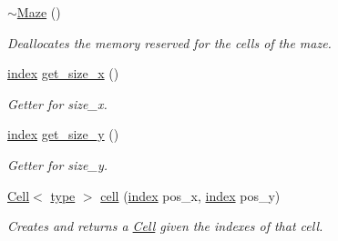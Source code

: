 \begin{DoxyCompactItemize}
\mbox{\label{classmaze_1_1Maze_a7da6ceefb06d25ef546e1512e6baa684}} 
\hyperlink{classmaze_1_1Maze_a7da6ceefb06d25ef546e1512e6baa684}{$\sim$\+Maze} ()
\begin{DoxyCompactList}\small\item\em Deallocates the memory reserved for the cells of the maze. \end{DoxyCompactList}\item 
\mbox{\label{classmaze_1_1Maze_ad4575b2541d3838c2ece35be9a2ba71a}} 
\hyperlink{namespacemaze_ae8120a098fabafbbfa264a3c619640b3}{index} \hyperlink{classmaze_1_1Maze_ad4575b2541d3838c2ece35be9a2ba71a}{get\+\_\+size\+\_\+x} ()
\begin{DoxyCompactList}\small\item\em Getter for size\+\_\+x. \end{DoxyCompactList}\item 
\mbox{\label{classmaze_1_1Maze_a3ec42515fd665b1225944e806cd0c739}} 
\hyperlink{namespacemaze_ae8120a098fabafbbfa264a3c619640b3}{index} \hyperlink{classmaze_1_1Maze_a3ec42515fd665b1225944e806cd0c739}{get\+\_\+size\+\_\+y} ()
\begin{DoxyCompactList}\small\item\em Getter for size\+\_\+y. \end{DoxyCompactList}\item 
\hyperlink{classmaze_1_1Cell}{Cell}$<$ \hyperlink{classmaze_1_1Maze_a9f056be7a10507d578e4608e31a3d6fc}{type} $>$ \hyperlink{classmaze_1_1Maze_ae538f5777c03216dddbdbd8da5623ca9}{cell} (\hyperlink{namespacemaze_ae8120a098fabafbbfa264a3c619640b3}{index} pos\+\_\+x, \hyperlink{namespacemaze_ae8120a098fabafbbfa264a3c619640b3}{index} pos\+\_\+y)
\begin{DoxyCompactList}\small\item\em Creates and returns a \hyperlink{classmaze_1_1Cell}{Cell} given the indexes of that cell. \end{DoxyCompactList}\end{DoxyCompactItemize}
